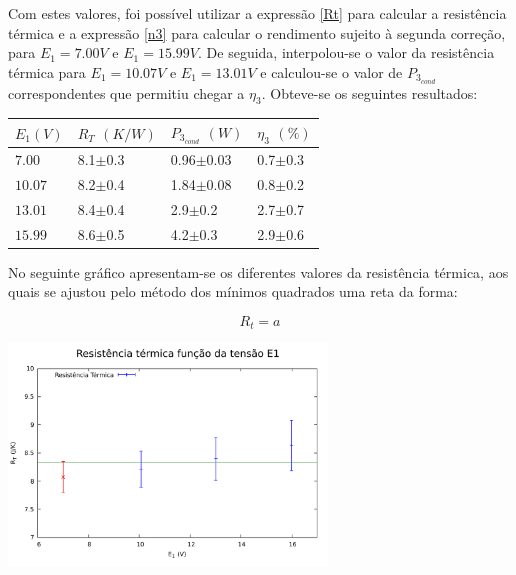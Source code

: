 \documentclass[9pt]{extarticle}
\begin{document}
\begin{multicols}{2}
\par Com estes valores, foi possível utilizar a expressão \eqref{Rt} para calcular a resistência térmica e a expressão \eqref{n3} para calcular o rendimento sujeito à segunda correção, para $E_1=7.00V$ e $E_1=15.99V$. De seguida, interpolou-se o valor da resistência térmica para $E_1=10.07V$ e $E_1=13.01V$ e calculou-se o valor de $P_{3_{cond}}$ correspondentes que permitiu chegar a $\eta_3$. Obteve-se os seguintes resultados:

{\footnotesize
\begin{center}
\begin{tabular}{x{1.1cm} x{1.4cm} x{1.7cm} x{1.4cm}}
$E_1(V)$ & $R_T$ $(K/W)$ & $P_{3_{cond}}$ $(W)$ & $\eta_3$ $(\%)$ \tabularnewline
\hline \hline
$7.00$  & 8.1$\pm$0.3 & 0.96$\pm$0.03 & 0.7$\pm$0.3 \tabularnewline
$10.07$ & 8.2$\pm$0.4 & 1.84$\pm$0.08 & 0.8$\pm$0.2 \tabularnewline
$13.01$ & 8.4$\pm$0.4 & 2.9$\pm$0.2 & 2.7$\pm$0.7 \tabularnewline
$15.99$ & 8.6$\pm$0.5 & 4.2$\pm$0.3 & 2.9$\pm$0.6 \tabularnewline
\end{tabular}
\par{}
\end{center}
}

\par No seguinte gráfico apresentam-se os diferentes valores da resistência térmica, aos quais se ajustou pelo método dos mínimos quadrados uma reta da forma:

\begin{equation} \label{a}
R_t = a
\end{equation}

\begin{center}
\includegraphics[width=240pt]{PreferidoDoRodrigo.pdf}
\par{}
\end{center}


\end{multicols}
\end{document}

